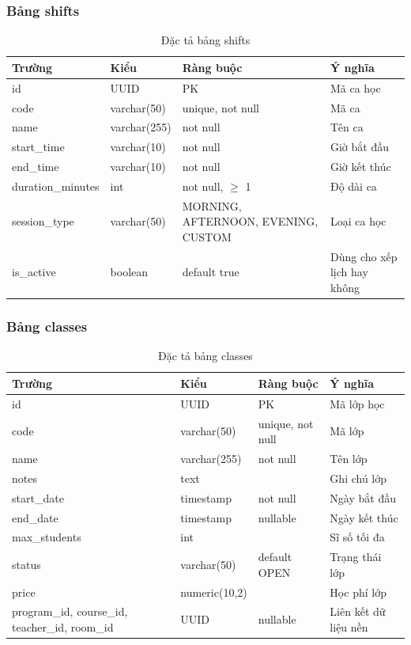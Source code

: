 \documentclass[../DoAn.tex]{subfiles}
\begin{document}
\subsubsection{Bảng shifts}
\begin{table}[H]
\centering
\caption{Đặc tả bảng shifts}
\scriptsize
\begin{tabular}{|l|l|p{3cm}|p{3.5cm}|}
\hline
\textbf{Trường} & \textbf{Kiểu} & \textbf{Ràng buộc} & \textbf{Ý nghĩa} \\ \hline
id & UUID & PK & Mã ca học \\ \hline
code & varchar(50) & unique, not null & Mã ca \\ \hline
name & varchar(255) & not null & Tên ca \\ \hline
start\_time & varchar(10) & not null & Giờ bắt đầu \\ \hline
end\_time & varchar(10) & not null & Giờ kết thúc \\ \hline
duration\_minutes & int & not null, $\geq$ 1 & Độ dài ca \\ \hline
session\_type & varchar(50) & MORNING, AFTERNOON, EVENING, CUSTOM & Loại ca học \\ \hline
is\_active & boolean & default true & Dùng cho xếp lịch hay không \\ \hline
\end{tabular}
\end{table}

\subsubsection{Bảng classes}
\begin{table}[H]
\centering
\caption{Đặc tả bảng classes}
\scriptsize
\begin{tabular}{|l|l|p{3cm}|p{3.5cm}|}
\hline
\textbf{Trường} & \textbf{Kiểu} & \textbf{Ràng buộc} & \textbf{Ý nghĩa} \\ \hline
id & UUID & PK & Mã lớp học \\ \hline
code & varchar(50) & unique, not null & Mã lớp \\ \hline
name & varchar(255) & not null & Tên lớp \\ \hline
notes & text & & Ghi chú lớp \\ \hline
start\_date & timestamp & not null & Ngày bắt đầu \\ \hline
end\_date & timestamp & nullable & Ngày kết thúc \\ \hline
max\_students & int & & Sĩ số tối đa \\ \hline
status & varchar(50) & default OPEN & Trạng thái lớp \\ \hline
price & numeric(10,2) & & Học phí lớp \\ \hline
program\_id, course\_id, teacher\_id, room\_id & UUID & nullable & Liên kết dữ liệu nền \\ \hline
\end{tabular}
\end{table}
\end{document}

